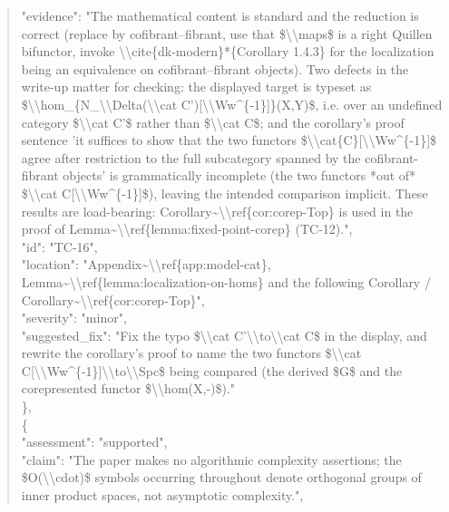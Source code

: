 \documentclass[11pt]{article}
\begin{document}
\begin{quote}
      "evidence": "The mathematical content is standard and the reduction is correct (replace by cofibrant--fibrant, use that \$\textbackslash{}\textbackslash{}maps\$ is a right Quillen bifunctor, invoke \textbackslash{}\textbackslash{}cite\{dk-modern\}*\{Corollary 1.4.3\} for the localization being an equivalence on cofibrant--fibrant objects). Two defects in the write-up matter for checking: the displayed target is typeset as \$\textbackslash{}\textbackslash{}hom\_\{N\_\textbackslash{}\textbackslash{}Delta(\textbackslash{}\textbackslash{}cat C')[\textbackslash{}\textbackslash{}Ww\^{}\{-1\}]\}(X,Y)\$, i.e. over an undefined category \$\textbackslash{}\textbackslash{}cat C'\$ rather than \$\textbackslash{}\textbackslash{}cat C\$; and the corollary's proof sentence 'it suffices to show that the two functors \$\textbackslash{}\textbackslash{}cat\{C\}[\textbackslash{}\textbackslash{}Ww\^{}\{-1\}]\$ agree after restriction to the full subcategory spanned by the cofibrant-fibrant objects' is grammatically incomplete (the two functors *out of* \$\textbackslash{}\textbackslash{}cat C[\textbackslash{}\textbackslash{}Ww\^{}\{-1\}]\$), leaving the intended comparison implicit. These results are load-bearing: Corollary\~{}\textbackslash{}\textbackslash{}ref\{cor:corep-Top\} is used in the proof of Lemma\~{}\textbackslash{}\textbackslash{}ref\{lemma:fixed-point-corep\} (TC-12).",\\
      "id": "TC-16",\\
      "location": "Appendix\~{}\textbackslash{}\textbackslash{}ref\{app:model-cat\}, Lemma\~{}\textbackslash{}\textbackslash{}ref\{lemma:localization-on-homs\} and the following Corollary / Corollary\~{}\textbackslash{}\textbackslash{}ref\{cor:corep-Top\}",\\
      "severity": "minor",\\
      "suggested\_fix": "Fix the typo \$\textbackslash{}\textbackslash{}cat C'\textbackslash{}\textbackslash{}to\textbackslash{}\textbackslash{}cat C\$ in the display, and rewrite the corollary's proof to name the two functors \$\textbackslash{}\textbackslash{}cat C[\textbackslash{}\textbackslash{}Ww\^{}\{-1\}]\textbackslash{}\textbackslash{}to\textbackslash{}\textbackslash{}Spc\$ being compared (the derived \$G\$ and the corepresented functor \$\textbackslash{}\textbackslash{}hom(X,-)\$)."\\
    \},\\
    \{\\
      "assessment": "supported",\\
      "claim": "The paper makes no algorithmic complexity assertions; the \$O(\textbackslash{}\textbackslash{}cdot)\$ symbols occurring throughout denote orthogonal groups of inner product spaces, not asymptotic complexity.",\\

\end{quote}
\end{document}
